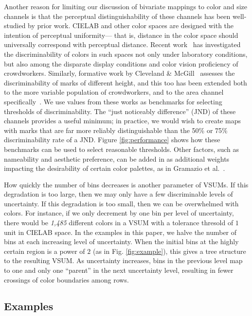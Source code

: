 \documentclass{vgtc}                          %
\begin{document}
Another reason for limiting our discussion of bivariate mappings to color and size channels is that the perceptual distinguishability of these channels has been well-studied by prior work. CIELAB and other color spaces are designed with the intention of perceptual uniformity--- that is, distance in the color space should universally correspond with perceptual distance. Recent work~\cite{stone2014engineering,szafir2014adapting} has investigated the discriminability of colors in such spaces not only under laboratory conditions, but also among the disparate display conditions and color vision proficiency of crowdworkers. Similarly, formative work by Cleveland \& McGill~\cite{cleveland1984graphical} assesses the discriminability of marks of different height, and this too has been extended both to the more variable population of crowdworkers, and to the area channel specifically~\cite{heer2010crowdsourcing,talbot2014four}. We use values from these works as benchmarks for selecting thresholds of discriminability. The ``just noticeably difference'' (JND) of these channels provides a useful minimum; in practice, we would wish to create maps with marks that are far more reliably distinguishable than the 50\% or 75\% discriminability rate of a JND. Figure \ref{fig:performance} shows how these benchmarks can be used to select reasonable thresholds. Other factors, such as nameability and aesthetic preference, can be added in as additional weights impacting the desirability of certain color palettes, as in Gramazio et al.~\cite{gramazio2017colorgorical}.

How quickly the number of bins decreases is another parameter of VSUMs. If this degradation is too large, then we may only have a few discriminable levels of uncertainty. If this degradation is too small, then we can be overwhelmed with colors. For instance, if we only decrement by one bin per level of uncertainty, there would be \emph{1,485} different colors in a VSUM with a tolerance thresold of $1$ unit in CIELAB space. In the examples in this paper,  we halve the number of bins at each increasing level of uncertainty. When the initial bins at the highly certain region is a power of $2$ (as in Fig. \ref{fig:example}), this gives a tree structure to the resulting VSUM. As uncertainty increases, bins in the previous level map to one and only one ``parent'' in the next uncertainty level, resulting in fewer crossings of color boundaries among rows.

\subsection{Examples}
\end{document}
